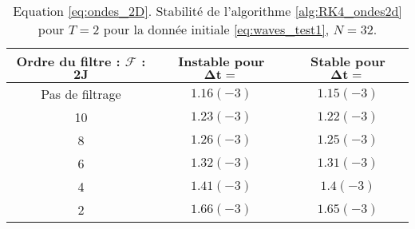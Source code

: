 \begin{table}[htbp]
\begin{center}
\begin{tabular}{|c||c|c|}
\hline
\textbf{Ordre du filtre : } $\mathbf{\mathcal{F}}$ : $\mathbf{2J}$  & \textbf{Instable pour} $\mathbf{\Delta t =}$ & \textbf{Stable pour} $\mathbf{\Delta t =}$ \\
\hline
\hline
Pas de filtrage & $1.16(-3)$ & $1.15(-3)$\\
10 & $1.23(-3)$ & $1.22(-3)$ \\
8 & $1.26(-3)$ & $1.25(-3)$ \\
6 & $1.32(-3)$ & $1.31(-3)$ \\
4 & $1.41(-3)$ & $1.4(-3)$ \\
2 & $1.66(-3)$ & $1.65(-3)$ \\
\hline
\end{tabular}
\end{center}
\caption{Equation \eqref{eq:ondes_2D}. Stabilité de l'algorithme \ref{alg:RK4_ondes2d} pour $T=2$ pour la donnée initiale \eqref{eq:waves_test1}, $N=32$.}
\label{tab:dt_critique_waves}
\end{table} 


